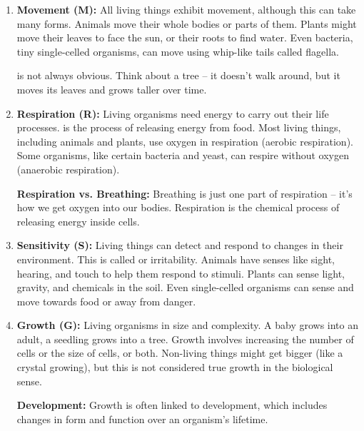 \begin{enumerate}
    \item \textbf{Movement (M):} All living things exhibit movement, although this can take many forms. Animals move their whole bodies or parts of them. Plants might move their leaves to face the sun, or their roots to find water. Even bacteria, tiny single-celled organisms, can move using whip-like tails called flagella.
    \begin{marginnote}
         is not always obvious. Think about a tree – it doesn't walk around, but it moves its leaves and grows taller over time.
    \end{marginnote}
    \item \textbf{Respiration (R):} Living organisms need energy to carry out their life processes.  is the process of releasing energy from food.  Most living things, including animals and plants, use oxygen in respiration (aerobic respiration). Some organisms, like certain bacteria and yeast, can respire without oxygen (anaerobic respiration).
    \begin{marginnote}
        \textbf{Respiration vs. Breathing:} Breathing is just one part of respiration – it's how we get oxygen into our bodies. Respiration is the chemical process of releasing energy inside cells.
    \end{marginnote}
    \item \textbf{Sensitivity (S):} Living things can detect and respond to changes in their environment. This is called  or irritability.  Animals have senses like sight, hearing, and touch to help them respond to stimuli. Plants can sense light, gravity, and chemicals in the soil. Even single-celled organisms can sense and move towards food or away from danger.
    \begin{marginnote}
    \end{marginnote}
    \item \textbf{Growth (G):} Living organisms  in size and complexity.  A baby grows into an adult, a seedling grows into a tree. Growth involves increasing the number of cells or the size of cells, or both. Non-living things might get bigger (like a crystal growing), but this is not considered true growth in the biological sense.
    \begin{marginnote}
        \textbf{Development:} Growth is often linked to development, which includes changes in form and function over an organism's lifetime.

\end{marginnote}
\end{enumerate}
